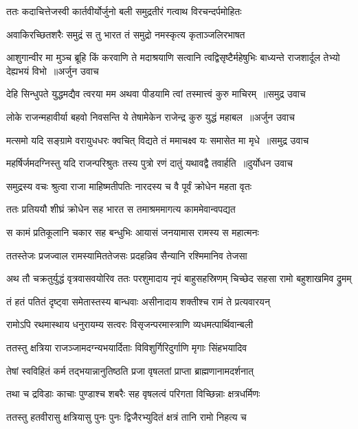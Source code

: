 \twolineshloka
{ततः कदाचित्तेजस्वी कार्तवीर्योर्जुनो बली}
{समुद्रतीरं गत्वाथ विरचन्दर्पमोहितः}


\twolineshloka
{अवाकिरच्छितशरैः समुद्रं स तु भारत}
{तं समुद्रो नमस्कृत्य कृताञ्जलिरभाषत}


\threelineshloka
{आशुगान्वीर मा मुञ्च ब्रूहि किं करवाणि ते}
{मदाश्रयाणि सत्वानि त्वद्विसृष्टैर्महेषुभिः}
{बाध्यन्ते राजशार्दूल तेभ्यो देह्यभयं विभो ॥अर्जुन उवाच}


\twolineshloka
{देहि सिन्धुपते युद्धमद्यैव त्वरया मम}
{अथवा पीडयामि त्वां तस्मात्त्वं कुरु माचिरम् ॥समुद्र उवाच}


\twolineshloka
{लोके राजन्महावीर्या बहवो निवसन्ति ये}
{तेषामेकेन राजेन्द्र कुरु युद्धं महाबल ॥अर्जुन उवाच}


\twolineshloka
{मत्समो यदि सङ्ग्रामे वरायुधधरः क्वचित्}
{विद्यते तं ममाचक्ष्व यः समासेत मा मृधे ॥समुद्र उवाच}


\twolineshloka
{महर्षिर्जमदग्निस्तु यदि राजन्परिश्रुतः}
{तस्य पुत्रो रणं दातुं यथावद्वै तवार्हति ॥दुर्योधन उवाच}


\twolineshloka
{समुद्रस्य वचः श्रुत्वा राजा माहिष्मतीपतिः}
{नारदस्य च वै पूर्वं क्रोधेन महता वृतः}


\twolineshloka
{ततः प्रतिययौ शीघ्रं क्रोधेन सह भारत}
{स तमाश्रममागत्य काममेवान्वपद्यत}


\twolineshloka
{स कामं प्रतिकूलानि चकार सह बन्धुभिः}
{आयासं जनयामास रामस्य स महात्मनः}


\twolineshloka
{ततस्तेजः प्रजज्वाल रामस्यामिततेजसः}
{प्रदहन्निव सैन्यानि रश्मिमानिव तेजसा}


अथ तौ चक्रतुर्युद्धं वृत्रवासवयोरिव
\twolineshloka
{ततः परशुमादाय नृपं बाहुसहस्रिणम्}
{चिच्छेद सहसा रामो बहुशाखमिव द्रुमम्}


\twolineshloka
{तं हतं पतितं दृष्ट्वा समेतास्तस्य बान्धवाः}
{असीनादाय शक्तीश्च रामं ते प्रत्यवारयन्}


\twolineshloka
{रामोऽपि रथमास्थाय धनुरायम्य सत्वरः}
{विसृजन्परमास्त्राणि व्यधमत्पार्थिवान्बली}


\twolineshloka
{ततस्तु क्षत्रिया राजञ्जामदग्न्यभयार्दिताः}
{विविशुर्गिरिदुर्गाणि मृगाः सिंहभयादिव}


\twolineshloka
{तेषां स्वविहितं कर्म तद्भयान्नानुतिष्ठति}
{प्रजा वृषलतां प्राप्ता ब्राह्मणानामदर्शनात्}


\twolineshloka
{तथा च द्रविडाः काचाः पुण्डाश्च शबरैः सह}
{वृषलत्वं परिगता विच्छिन्नाः क्षत्रधर्मिणः}


\twolineshloka
{ततस्तु हतवीरासु क्षत्रियासु पुनः पुनः}
{द्विजैरभ्युदितं क्षत्रं तानि रामो निहत्य च}


